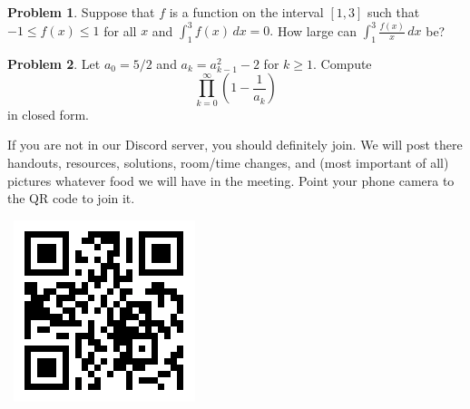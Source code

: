 \documentclass{scrartcl}
\theoremstyle{definition}
\newtheorem{prob}{Problem}
\begin{document}
	\setcounter{prob}{13}
	\begin{prob}%
		Suppose that $f$ is a function on the interval $[1,3]$ such that $-1\le f(x)\le 1$ for all $x$ and $\displaystyle \int_1^3f(x)\,dx=0.$ How large can $\displaystyle\int_1^3\frac{f(x)}x\,dx$ be?
	\end{prob}

	\begin{prob}%
		Let $a_0=5/2$ and $a_k=a_{k-1}^2-2$ for $k\ge 1.$ Compute \[\prod_{k=0}^{\infty}\left(1-\frac1{a_k}\right)\] in closed form.
	\end{prob}

	\vfill

	\begin{minipage}{.85\textwidth}{}
		\footnotesize
		If you are not in our Discord server, you should definitely join.
		We will post there handouts, resources, solutions, room/time changes, and (most important of all) pictures whatever food we will have in the meeting. Point your phone camera to the QR code to join it.
	\end{minipage}
	\begin{minipage}{.15\textwidth}{}
		\ \hfill \includegraphics[height = .8in]{qr}
	\end{minipage}
\end{document}
